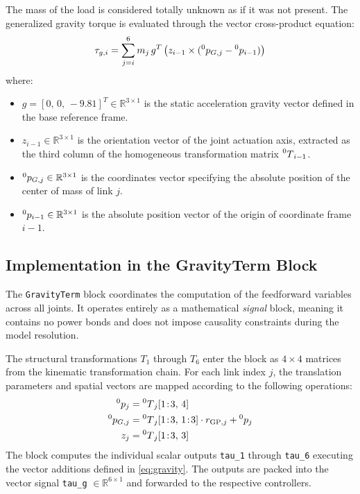 The mass of the load is considered totally unknown as if it was not present. The generalized gravity torque is evaluated through the vector cross-product equation:
\begin{equation}
  \tau_{g,i} = \sum_{j=i}^{6} m_j\, g^T \left(z_{i-1} \times (\prescript{0}{}{p}_{G,j} - \prescript{0}{}{p}_{i-1})\right)
  \label{eq:gravity}
\end{equation}
where:
\begin{itemize}
  \item $g = [0, \, 0, \, -9.81]^T \in \mathbb{R}^{3\times1}$ is the static acceleration gravity vector defined in the base reference frame.
  \item $z_{i-1} \in \mathbb{R}^{3\times1}$ is the orientation vector of the joint actuation axis, extracted as the third column of the homogeneous transformation matrix $\prescript{0}{}{T}_{i-1}$.
  \item $\prescript{0}{}{p}_{G,j} \in \mathbb{R}^{3\times1}$ is the coordinates vector specifying the absolute position of the center of mass of link $j$.
  \item $\prescript{0}{}{p}_{i-1} \in \mathbb{R}^{3\times1}$ is the absolute position vector of the origin of coordinate frame $i-1$.
\end{itemize}

\subsection{Implementation in the GravityTerm Block}

The \texttt{GravityTerm} block coordinates the computation of the feedforward variables across all joints. It operates entirely as a mathematical \emph{signal} block, meaning it contains no power bonds and does not impose causality constraints during the model resolution.

The structural transformations $T_1$ through $T_6$ enter the block as $4\times4$ matrices from the kinematic transformation chain. For each link index $j$, the translation parameters and spatial vectors are mapped according to the following operations:
\begin{align}
  \prescript{0}{}{p}_{j}     &= \prescript{0}{}{T}_j[1\!:\!3, \, 4] \\
  \prescript{0}{}{p}_{G,j} &= \prescript{0}{}{T}_j[1\!:\!3, \, 1\!:\!3]\cdot r_{\text{GP},j} + \prescript{0}{}{p}_{j} \\
  z_j       &= \prescript{0}{}{T}_j[1\!:\!3, \, 3]
\end{align}
The block computes the individual scalar outputs \texttt{tau\_1} through \texttt{tau\_6} executing the vector additions defined in \cref{eq:gravity}. The outputs are packed into the vector signal \texttt{tau\_g} $\in \mathbb{R}^{6\times1}$ and forwarded to the respective controllers.

